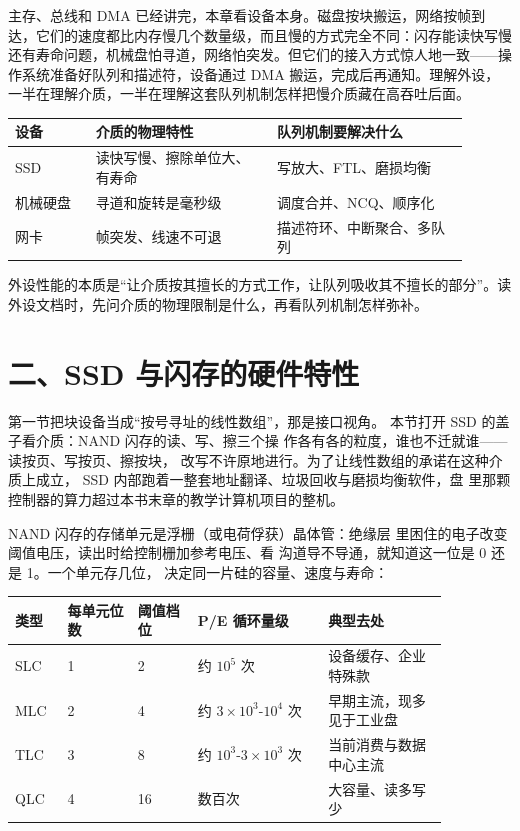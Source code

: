主存、总线和 DMA 已经讲完，本章看设备本身。磁盘按块搬运，网络按帧到达，它们的速度都比内存慢几个数量级，而且慢的方式完全不同：闪存能读快写慢还有寿命问题，机械盘怕寻道，网络怕突发。但它们的接入方式惊人地一致——操作系统准备好队列和描述符，设备通过 DMA 搬运，完成后再通知。理解外设，一半在理解介质，一半在理解这套队列机制怎样把慢介质藏在高吞吐后面。

\begin{longtable}{L{0.16\linewidth}L{0.36\linewidth}L{0.38\linewidth}}
\toprule
设备 & 介质的物理特性 & 队列机制要解决什么 \\
\midrule
SSD & 读快写慢、擦除单位大、有寿命 & 写放大、FTL、磨损均衡 \\\tablerowrule
机械硬盘 & 寻道和旋转是毫秒级 & 调度合并、NCQ、顺序化 \\\tablerowrule
网卡 & 帧突发、线速不可退 & 描述符环、中断聚合、多队列 \\
\bottomrule
\end{longtable}

\begin{keyidea}
外设性能的本质是“让介质按其擅长的方式工作，让队列吸收其不擅长的部分”。读外设文档时，先问介质的物理限制是什么，再看队列机制怎样弥补。
\end{keyidea}

\section{二、SSD 与闪存的硬件特性}

第一节把块设备当成“按号寻址的线性数组”，那是接口视角。
本节打开 SSD 的盖子看介质：NAND 闪存的读、写、擦三个操
作各有各的粒度，谁也不迁就谁——读按页、写按页、擦按块，
改写不许原地进行。为了让线性数组的承诺在这种介质上成立，
SSD 内部跑着一整套地址翻译、垃圾回收与磨损均衡软件，盘
里那颗控制器的算力超过本书末章的教学计算机项目的整机。

NAND 闪存的存储单元是浮栅（或电荷俘获）晶体管：绝缘层
里困住的电子改变阈值电压，读出时给控制栅加参考电压、看
沟道导不导通，就知道这一位是 0 还是 1。一个单元存几位，
决定同一片硅的容量、速度与寿命：

\begin{longtable}{L{0.1\linewidth}L{0.14\linewidth}L{0.12\linewidth}L{0.26\linewidth}L{0.24\linewidth}}
\toprule
类型 & 每单元位数 & 阈值档位 & P/E 循环量级 & 典型去处 \\
\midrule
SLC & 1 & 2 & 约 $10^{5}$ 次 & 设备缓存、企业特殊款 \\\tablerowrule
MLC & 2 & 4 & 约 $3\times10^{3}$-$10^{4}$ 次 & 早期主流，现多见于工业盘 \\\tablerowrule
TLC & 3 & 8 & 约 $10^{3}$-$3\times10^{3}$ 次 & 当前消费与数据中心主流 \\\tablerowrule
QLC & 4 & 16 & 数百次 & 大容量、读多写少 \\
\bottomrule
\end{longtable}

